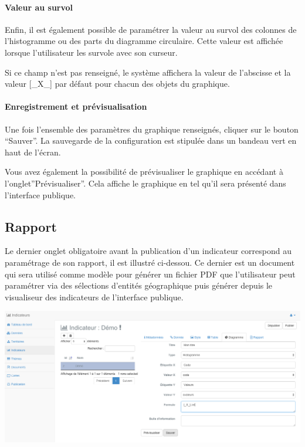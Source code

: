 \documentclass[letterpaper,10pt,french]{sphinxmanual}
\begin{document}
\paragraph{Valeur au survol}

Enfin, il est également possible de paramétrer la valeur au survol des colonnes de l'histogramme ou des parts du diagramme circulaire. Cette valeur est affichée lorsque l'utilisateur les survole avec son curseur.

Si ce champ n'est pas renseigné, le système affichera la valeur de l'abscisse et la valeur {[}\_X\_{]} par défaut pour chacun des objets du graphique.
\paragraph{Enregistrement et prévisualisation}

Une fois l'ensemble des paramètres du graphique renseignés, cliquer
sur le bouton ``Sauver''. La sauvegarde de la configuration est stipulée
dans un bandeau vert en haut de l'écran.

Vous avez également la possibilité de prévisualiser le graphique en
accédant à l'onglet''Prévisualiser''. Cela affiche le graphique en
tel qu'il sera présenté dans l'interface publique.


\subsection{Rapport}
\label{indicators/indicatorspanel:rapport}
Le dernier onglet obligatoire avant la publication d'un indicateur
correspond au paramétrage de son rapport, il est illustré
ci-dessou. Ce dernier est un document qui sera utilisé comme modèle
pour générer un fichier PDF que l'utilisateur peut paramétrer via des
sélections d'entités géographique puis générer depuis le visualiseur
des indicateurs de l'interface publique.

\includegraphics[width=1.000\linewidth]{indicator-graph.png}
\end{document}
